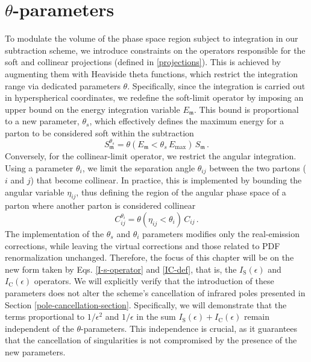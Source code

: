 \documentclass[a4paper, 12pt]{book}
\newcommand{\um}{\mathfrak{m}}
\begin{document}
\section{$\theta$-parameters}
To modulate the volume of the phase space region subject to integration in our subtraction scheme, we introduce constraints on the operators responsible for the soft and collinear projections (defined in \ref{projections}). This is achieved by augmenting them with Heaviside theta functions, which restrict the integration range via dedicated parameters $\theta$. Specifically, since the integration is carried out in hyperspherical coordinates, we redefine the soft-limit operator by imposing an upper bound on the energy integration variable $E_\um$. This bound is proportional to a new parameter, $\theta_s$, which effectively defines the maximum energy for a parton to be considered soft within the subtraction
\begin{equation}
S_\um^{\theta_s} = \theta{(E_\um < \theta_s \, E_{\mathrm{max}})} \, S_\um \,.
\end{equation}
Conversely, for the collinear-limit operator, we restrict the angular integration. Using a parameter $\theta_i$, we limit the separation angle $\theta_{ij}$ between the two partons ($i$ and $j$) that become collinear. In practice, this is implemented by bounding the angular variable $\eta_{ij}$, thus defining the region of the angular phase space of a parton where another parton is considered collinear
\begin{equation}
C_{ij}^{\theta_i} = \theta{(\eta_{ij} < \theta_i )} \, C_{ij}\, .
\end{equation}
The implementation of the $\theta_s$ and $\theta_i$ parameters modifies only the real-emission corrections, while leaving the virtual corrections and those related to PDF renormalization unchanged. Therefore, the focus of this chapter will be on the new form taken by Eqs. \ref{I-s-operator} and \ref{IC-def}, that is, the $I_{\mathrm{S}}(\epsilon)$ and $I_{\mathrm{C}}(\epsilon)$ operators. We will explicitly verify that the introduction of these parameters does not alter the scheme's cancellation of infrared poles presented in Section \ref{pole-cancellation-section}. Specifically, we will demonstrate that the terms proportional to $1/\epsilon^2$ and $1/\epsilon$ in the sum $I_{\mathrm{S}}(\epsilon) + I_{\mathrm{C}}(\epsilon)$ remain independent of the $\theta$-parameters. This independence is crucial, as it guarantees that the cancellation of singularities is not compromised by the presence of the new parameters.
\end{document}
